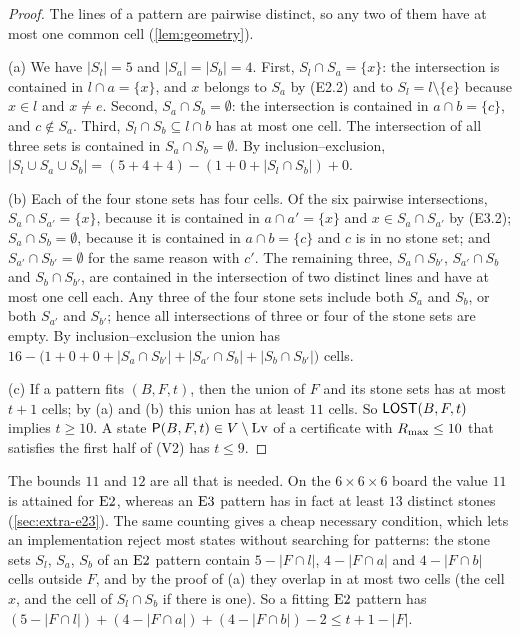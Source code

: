 \begin{proof}
The lines of a pattern are pairwise distinct, so any two of them have at most one common cell
(\cref{lem:geometry}).

(a) We have $|S_l|=5$ and $|S_a|=|S_b|=4$. First, $S_l\cap S_a=\{x\}$: the intersection is contained in
$l\cap a=\{x\}$, and $x$ belongs to $S_a$ by (E2.2) and to $S_l=l\setminus\{e\}$ because $x\in l$
and $x\ne e$. Second, $S_a\cap S_b=\emptyset$: the intersection is contained in $a\cap b=\{c\}$, and
$c\notin S_a$. Third, $S_l\cap S_b\subseteq l\cap b$ has at most one cell. The intersection of all three
sets is contained in $S_a\cap S_b=\emptyset$. By inclusion--exclusion,
$|S_l\cup S_a\cup S_b|=(5+4+4)-(1+0+|S_l\cap S_b|)+0$.

(b) Each of the four stone sets has four cells. Of the six pairwise intersections, $S_a\cap S_{a'}=\{x\}$,
because it is contained in $a\cap a'=\{x\}$ and $x\in S_a\cap S_{a'}$ by (E3.2); $S_a\cap S_b=\emptyset$,
because it is contained in $a\cap b=\{c\}$ and $c$ is in no stone set; and $S_{a'}\cap S_{b'}=\emptyset$ for the
same reason with $c'$. The remaining three, $S_a\cap S_{b'}$, $S_{a'}\cap S_b$ and $S_b\cap S_{b'}$, are
contained in the intersection of two distinct lines and have at most one cell each. Any three of the four
stone sets include both $S_a$ and $S_b$, or both $S_{a'}$ and $S_{b'}$; hence all intersections of three or
four of the stone sets are empty. By inclusion--exclusion the union has
$16-\bigl(1+0+0+|S_a\cap S_{b'}|+|S_{a'}\cap S_b|+|S_b\cap S_{b'}|\bigr)$ cells.

(c) If a pattern fits $(B,F,t)$, then the union of $F$ and its stone sets has at most $t+1$ cells; by (a)
and (b) this union has at least $11$ cells. So $\mathsf{LOST}(B,F,t)$ implies $t\ge 10$. A state
$\mathsf{P}(B,F,t)\in V\setminus\mathrm{Lv}$ of a certificate with $R_{\max}\le 10$ that satisfies the first half of (V2) has
$t\le 9$.
\end{proof}

The bounds $11$ and $12$ are all that is needed. On the $6\times6\times6$ board the value $11$ is attained
for $\mathrm{E2}$, whereas an $\mathrm{E3}$ pattern has in fact at least $13$ distinct stones
(\cref{sec:extra-e23}). The same counting gives a cheap necessary condition, which lets an
implementation reject most states without searching for patterns: the stone sets $S_l$, $S_a$, $S_b$ of an
$\mathrm{E2}$ pattern contain $5-|F\cap l|$, $4-|F\cap a|$ and $4-|F\cap b|$ cells outside $F$, and by the proof of
(a) they overlap in at most two cells (the cell $x$, and the cell of $S_l\cap S_b$ if there is one). So a
fitting $\mathrm{E2}$ pattern has
$(5-|F\cap l|)+(4-|F\cap a|)+(4-|F\cap b|)-2\le t+1-|F|$.

